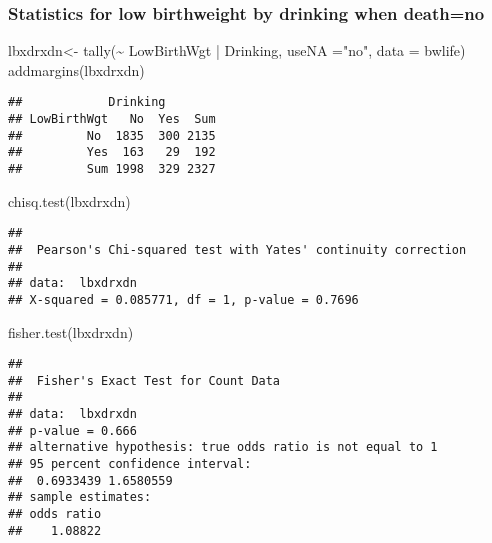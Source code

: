 \documentclass[
]{article}
\newenvironment{Shaded}{\begin{snugshade}}{\end{snugshade}}
\newcommand{\AttributeTok}[1]{\textcolor[rgb]{0.77,0.63,0.00}{#1}}
\newcommand{\FunctionTok}[1]{\textcolor[rgb]{0.00,0.00,0.00}{#1}}
\newcommand{\NormalTok}[1]{#1}
\newcommand{\OtherTok}[1]{\textcolor[rgb]{0.56,0.35,0.01}{#1}}
\newcommand{\SpecialCharTok}[1]{\textcolor[rgb]{0.00,0.00,0.00}{#1}}
\newcommand{\StringTok}[1]{\textcolor[rgb]{0.31,0.60,0.02}{#1}}
\begin{document}
\hypertarget{statistics-for-low-birthweight-by-drinking-when-deathno}{%
\subsubsection{Statistics for low birthweight by drinking when
death=no}\label{statistics-for-low-birthweight-by-drinking-when-deathno}}

\begin{Shaded}
\begin{Highlighting}[]
\NormalTok{lbxdrxdn}\OtherTok{\textless{}{-}} \FunctionTok{tally}\NormalTok{(}\SpecialCharTok{\textasciitilde{}}\NormalTok{ LowBirthWgt }\SpecialCharTok{|}\NormalTok{ Drinking, }\AttributeTok{useNA =}\StringTok{"no"}\NormalTok{, }\AttributeTok{data =}\NormalTok{ bwlife)}
\FunctionTok{addmargins}\NormalTok{(lbxdrxdn)}
\end{Highlighting}
\end{Shaded}

\begin{verbatim}
##            Drinking
## LowBirthWgt   No  Yes  Sum
##         No  1835  300 2135
##         Yes  163   29  192
##         Sum 1998  329 2327
\end{verbatim}

\begin{Shaded}
\begin{Highlighting}[]
\FunctionTok{chisq.test}\NormalTok{(lbxdrxdn)}
\end{Highlighting}
\end{Shaded}

\begin{verbatim}
## 
##  Pearson's Chi-squared test with Yates' continuity correction
## 
## data:  lbxdrxdn
## X-squared = 0.085771, df = 1, p-value = 0.7696
\end{verbatim}

\begin{Shaded}
\begin{Highlighting}[]
\FunctionTok{fisher.test}\NormalTok{(lbxdrxdn)}
\end{Highlighting}
\end{Shaded}

\begin{verbatim}
## 
##  Fisher's Exact Test for Count Data
## 
## data:  lbxdrxdn
## p-value = 0.666
## alternative hypothesis: true odds ratio is not equal to 1
## 95 percent confidence interval:
##  0.6933439 1.6580559
## sample estimates:
## odds ratio 
##    1.08822
\end{verbatim}
\end{document}
